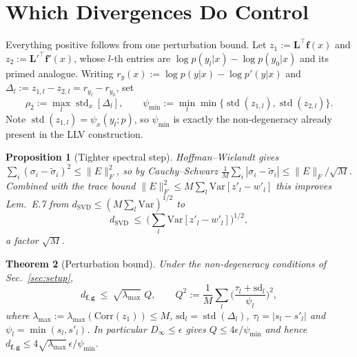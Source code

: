 \documentclass[10pt,letterpaper,twocolumn]{article}
\newcommand{\bff}{\mathbf{f}}
\newcommand{\bfg}{\mathbf{g}}
\newcommand{\bfL}{\mathbf{L}}
\newcommand{\dSVD}{d_{\mathrm{SVD}}}
\newcommand{\dfg}{d_{\bff,\bfg}}
\newcommand{\Dinf}{D_{\infty}}
\newcommand{\psix}{\psi_{x}}
\newcommand{\Var}{\mathrm{Var}}
\theoremstyle{plain}
\newtheorem{theorem}{Theorem}
\newtheorem{proposition}[theorem]{Proposition}
\theoremstyle{definition}
\theoremstyle{remark}
\begin{document}
\section{Which Divergences Do Control}
\label{sec:positive}

Everything positive follows from one perturbation bound. Let
$z_{1}:=\bfL^{\top}\bff(x)$ and $z_{2}:=\bfL'^{\top}\bff'(x)$, whose $l$-th
entries are $\log p(y_{l}|x)-\log p(y_{0}|x)$ and its primed analogue. Writing
$r_{y}(x):=\log p(y|x)-\log p'(y|x)$ and
$\Delta_{l}:=z_{1,l}-z_{2,l}=r_{y_{l}}-r_{y_{0}}$, set
\begin{equation}
\rho_{2}:=\max_{l}\operatorname{std}_{x}[\Delta_{l}],\qquad
\psi_{\min}:=\min_{l}\min\{\operatorname{std}(z_{1,l}),
\operatorname{std}(z_{2,l})\}.
\label{eq:rho2}
\end{equation}
Note $\operatorname{std}(z_{1,l})=\psix(y_{l};p)$, so $\psi_{\min}$ is exactly
the non-degeneracy already present in the LLV construction.

\begin{proposition}[Tighter spectral step]
\label{prop:tighten}
Hoffman--Wielandt gives $\sum_{i}(\sigma_{i}-\tilde\sigma_{i})^{2}\le\|E\|_{F}^{2}$,
so by Cauchy--Schwarz
$\tfrac1M\sum_{i}|\sigma_{i}-\tilde\sigma_{i}|\le\|E\|_{F}/\sqrt{M}$. Combined
with the trace bound $\|E\|_{F}^{2}\le M\sum_{l}\Var[z'_{l}-w'_{l}]$ this
improves Lem.~E.7 from
$\dSVD\le(M\sum_{l}\Var)^{1/2}$ to
\begin{equation}
\dSVD\ \le\ \Big(\textstyle\sum_{l}\Var[z'_{l}-w'_{l}]\Big)^{1/2},
\label{eq:hw}
\end{equation}
a factor $\sqrt{M}$.
\end{proposition}

\begin{theorem}[Perturbation bound]
\label{thm:maxdiv}
Under the non-degeneracy conditions of Sec.~\ref{sec:setup},
\begin{equation}
\dfg\ \le\ \sqrt{\lambda_{\max}}\;Q,\qquad
Q^{2}:=\frac1M\sum_{l}\Big(\frac{\tau_{l}+\mathrm{sd}_{l}}{\psi_{l}}\Big)^{2},
\label{eq:maxdiv-bound}
\end{equation}
where $\lambda_{\max}:=\lambda_{\max}(\mathrm{Corr}(z_{1}))\le M$,
$\mathrm{sd}_{l}=\operatorname{std}(\Delta_{l})$, $\tau_{l}=|s_{l}-s'_{l}|$ and
$\psi_{l}=\min(s_{l},s'_{l})$. In particular
$\Dinf\le\epsilon$ gives $Q\le4\epsilon/\psi_{\min}$ and hence
$\dfg\le4\sqrt{\lambda_{\max}}\,\epsilon/\psi_{\min}$.
\end{theorem}
\end{document}
